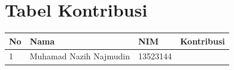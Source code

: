 \section{Tabel Kontribusi}
\label{sec:kontribusi}

\begin{longtable}{p{} p{} p{} p{}}
\toprule
No & Nama & NIM & Kontribusi \\
\midrule
\endhead
1 & Muhamad Nazih Najmudin & 13523144 & \\
\bottomrule
\end{longtable}
